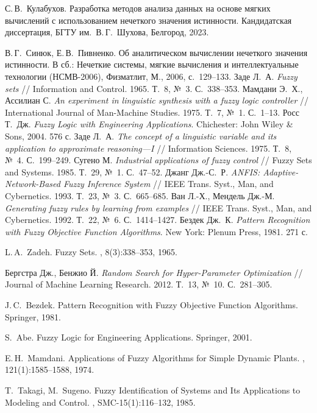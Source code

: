 \eskdrerun{}

\begin{thebibliography}{200}
С.\,В.~Кулабухов.
\newblock Разработка методов анализа данных на основе мягких вычислений
  с использованием нечеткого значения истинности.
\newblock Кандидатская диссертация, БГТУ им.~В.\,Г.~Шухова, Белгород, 2023.

В.\,Г.~Синюк, Е.\,В.~Пивненко.
\newblock Об аналитическом вычислении нечеткого значения истинности.
\newblock В сб.: Нечеткие системы, мягкие вычисления и интеллектуальные технологии (НСМВ-2006), Физматлит, М., 2006, с.~129–133.
  Заде Л.~А. \emph{Fuzzy sets} // Information and Control. 1965. Т.~8, №~3. С.~338--353.
  Мамдани Э.~Х., Ассилиан С. \emph{An experiment in linguistic synthesis with a fuzzy logic controller} // International Journal of Man-Machine Studies. 1975. Т.~7, №~1. С.~1--13.
  Росс Т.~Дж. \emph{Fuzzy Logic with Engineering Applications}. Chichester: John Wiley \& Sons, 2004. 576 с.
  Заде Л.~А. \emph{The concept of a linguistic variable and its application to approximate reasoning—I} // Information Sciences. 1975. Т.~8, №~4. С.~199--249.
  Сугено М. \emph{Industrial applications of fuzzy control} // Fuzzy Sets and Systems. 1985. Т.~29, №~1. С.~47--52.
  Джанг Дж.-С.~Р. \emph{ANFIS: Adaptive-Network-Based Fuzzy Inference System} // IEEE Trans. Syst., Man, and Cybernetics. 1993. Т.~23, №~3. С.~665--685.
  Ван Л.-Х., Мендель Дж.-М. \emph{Generating fuzzy rules by learning from examples} // IEEE Trans. Syst., Man, and Cybernetics. 1992. Т.~22, №~6. С.~1414--1427.
  Бездек Дж.~К. \emph{Pattern Recognition with Fuzzy Objective Function Algorithms}. New York: Plenum Press, 1981. 271 с.

L.\,A.~Zadeh.
\newblock Fuzzy Sets.
, 8(3):338–353, 1965.

  Бергстра Дж., Бенжио Й. \emph{Random Search for Hyper-Parameter Optimization} // Journal of Machine Learning Research. 2012. Т.~13, №~10. С.~281--305.
  
J.\,C.~Bezdek.
\newblock Pattern Recognition with Fuzzy Objective Function Algorithms.
\newblock Springer, 1981.

S.~Abe.
\newblock Fuzzy Logic for Engineering Applications.
\newblock Springer, 2001.

E.\,H.~Mamdani.
\newblock Applications of Fuzzy Algorithms for Simple Dynamic Plants.
, 121(1):1585–1588, 1974.

T.~Takagi, M.~Sugeno.
\newblock Fuzzy Identification of Systems and Its Applications to Modeling and Control.
, SMC-15(1):116–132, 1985.
\end{thebibliography}

